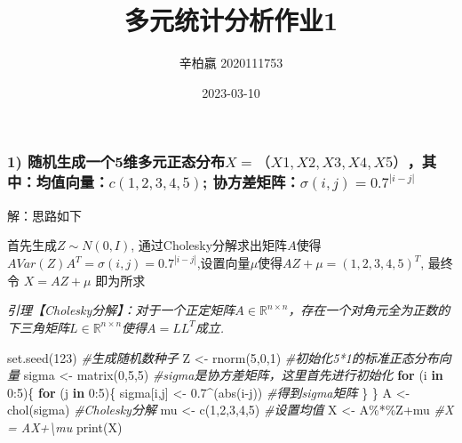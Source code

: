 \documentclass[
]{article}
\title{多元统计分析作业1}
\author{辛柏嬴 2020111753}
\date{2023-03-10}
\newenvironment{Shaded}{\begin{snugshade}}{\end{snugshade}}
\newcommand{\CommentTok}[1]{\textcolor[rgb]{0.56,0.35,0.01}{\textit{#1}}}
\newcommand{\ControlFlowTok}[1]{\textcolor[rgb]{0.13,0.29,0.53}{\textbf{#1}}}
\newcommand{\DecValTok}[1]{\textcolor[rgb]{0.00,0.00,0.81}{#1}}
\newcommand{\FloatTok}[1]{\textcolor[rgb]{0.00,0.00,0.81}{#1}}
\newcommand{\FunctionTok}[1]{\textcolor[rgb]{0.00,0.00,0.00}{#1}}
\newcommand{\NormalTok}[1]{#1}
\newcommand{\OtherTok}[1]{\textcolor[rgb]{0.56,0.35,0.01}{#1}}
\newcommand{\SpecialCharTok}[1]{\textcolor[rgb]{0.00,0.00,0.00}{#1}}
\begin{document}
\maketitle

\hypertarget{ux968fux673aux751fux6210ux4e00ux4e2a5ux7ef4ux591aux5143ux6b63ux6001ux5206ux5e03xx1x2x3x4x5ux5176ux4e2dux5747ux503cux5411ux91cfc12345-ux534fux65b9ux5deeux77e9ux9635sigmaij-0.7i-j}{%
\subsubsection{\texorpdfstring{\textbf{1)
随机生成一个5维多元正态分布\(X=（X1,X2,X3,X4,X5）\)，其中：均值向量：\(c(1,2,3,4,5)\);
协方差矩阵：\(\sigma(i,j) = 0.7^{|i-j|}\)}}{1) 随机生成一个5维多元正态分布X=（X1,X2,X3,X4,X5），其中：均值向量：c(1,2,3,4,5); 协方差矩阵：\textbackslash sigma(i,j) = 0.7\^{}\{\textbar i-j\textbar\}}}\label{ux968fux673aux751fux6210ux4e00ux4e2a5ux7ef4ux591aux5143ux6b63ux6001ux5206ux5e03xx1x2x3x4x5ux5176ux4e2dux5747ux503cux5411ux91cfc12345-ux534fux65b9ux5deeux77e9ux9635sigmaij-0.7i-j}}

解：思路如下

首先生成\(Z\sim N(0,I)\),
通过Cholesky分解求出矩阵\(A\)使得\(A Var(Z)A^T = \sigma(i,j) = 0.7^{|i-j|}\),设置向量\(\mu\)使得\(AZ+\mu=(1,2,3,4,5)^T\),
最终令 \(X = AZ+\mu\) 即为所求

\emph{引理【Cholesky分解】：对于一个正定矩阵\(A\in \mathbb{R}^{n\times n}\)，存在一个对角元全为正数的下三角矩阵\(L\in \mathbb{R}^{n\times n}\)使得\(A=LL^T\)成立.}

\begin{Shaded}
\begin{Highlighting}[]
\FunctionTok{set.seed}\NormalTok{(}\DecValTok{123}\NormalTok{) }\CommentTok{\#生成随机数种子}
\NormalTok{Z }\OtherTok{\textless{}{-}} \FunctionTok{rnorm}\NormalTok{(}\DecValTok{5}\NormalTok{,}\DecValTok{0}\NormalTok{,}\DecValTok{1}\NormalTok{) }\CommentTok{\#初始化5*1的标准正态分布向量}
\NormalTok{sigma }\OtherTok{\textless{}{-}} \FunctionTok{matrix}\NormalTok{(}\DecValTok{0}\NormalTok{,}\DecValTok{5}\NormalTok{,}\DecValTok{5}\NormalTok{) }\CommentTok{\#sigma是协方差矩阵，这里首先进行初始化}
\ControlFlowTok{for}\NormalTok{ (i }\ControlFlowTok{in} \DecValTok{0}\SpecialCharTok{:}\DecValTok{5}\NormalTok{)\{}
  \ControlFlowTok{for}\NormalTok{ (j }\ControlFlowTok{in} \DecValTok{0}\SpecialCharTok{:}\DecValTok{5}\NormalTok{)\{}
\NormalTok{    sigma[i,j] }\OtherTok{\textless{}{-}} \FloatTok{0.7}\SpecialCharTok{\^{}}\NormalTok{(}\FunctionTok{abs}\NormalTok{(i}\SpecialCharTok{{-}}\NormalTok{j)) }\CommentTok{\#得到sigma矩阵}
\NormalTok{  \}}
\NormalTok{\}}
\NormalTok{A }\OtherTok{\textless{}{-}} \FunctionTok{chol}\NormalTok{(sigma) }\CommentTok{\#Cholesky分解}
\NormalTok{mu }\OtherTok{\textless{}{-}} \FunctionTok{c}\NormalTok{(}\DecValTok{1}\NormalTok{,}\DecValTok{2}\NormalTok{,}\DecValTok{3}\NormalTok{,}\DecValTok{4}\NormalTok{,}\DecValTok{5}\NormalTok{) }\CommentTok{\#设置均值}
\NormalTok{X }\OtherTok{\textless{}{-}}\NormalTok{ A}\SpecialCharTok{\%*\%}\NormalTok{Z}\SpecialCharTok{+}\NormalTok{mu }\CommentTok{\#X = AX+\textbackslash{}mu}
\FunctionTok{print}\NormalTok{(X)}
\end{Highlighting}
\end{Shaded}
\end{document}
